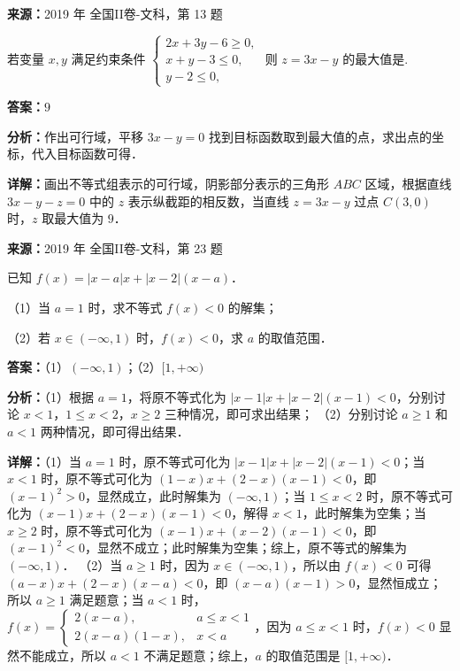 \begin{question}[points=5]
\textbf{来源：}2019 年 全国II卷-文科，第 13 题\par
若变量 $x,y$ 满足约束条件 $\begin{cases}2x+3y-6\ge 0,\\ x+y-3\le 0,\\ y-2\le 0,\end{cases}$ 则 $z=3x-y$ 的最大值是.
\fillin[{$9$}]
\begin{solution}
\textbf{答案：}$9$

\textbf{分析：}作出可行域，平移 $3x-y=0$ 找到目标函数取到最大值的点，求出点的坐标，代入目标函数可得．

\textbf{详解：}画出不等式组表示的可行域，阴影部分表示的三角形 $ABC$ 区域，根据直线 $3x-y-z=0$ 中的 $z$ 表示纵截距的相反数，当直线 $z=3x-y$ 过点 $C(3,0)$ 时，$z$ 取最大值为 $9$．
\end{solution}
\end{question}

\begin{question}[points=10]
\textbf{来源：}2019 年 全国II卷-文科，第 23 题\par
[选修 4-5：不等式选讲]

已知 $f(x)=|x-a|x+|x-2|(x-a)$．

（1）当 $a=1$ 时，求不等式 $f(x)<0$ 的解集；

（2）若 $x\in(-\infty,1)$ 时，$f(x)<0$，求 $a$ 的取值范围．
\begin{solution}
\textbf{答案：}（1）$(-\infty,1)$；（2）$[1,+\infty)$

\textbf{分析：}（1）根据 $a=1$，将原不等式化为 $|x-1|x+|x-2|(x-1)<0$，分别讨论 $x<1$，$1\le x<2$，$x\ge2$ 三种情况，即可求出结果；
（2）分别讨论 $a\ge1$ 和 $a<1$ 两种情况，即可得出结果．

\textbf{详解：}（1）当 $a=1$ 时，原不等式可化为 $|x-1|x+|x-2|(x-1)<0$；当 $x<1$ 时，原不等式可化为 $(1-x)x+(2-x)(x-1)<0$，即 $(x-1)^2>0$，显然成立，此时解集为 $(-\infty,1)$；当 $1\le x<2$ 时，原不等式可化为 $(x-1)x+(2-x)(x-1)<0$，解得 $x<1$，此时解集为空集；当 $x\ge2$ 时，原不等式可化为 $(x-1)x+(x-2)(x-1)<0$，即 $(x-1)^2<0$，显然不成立；此时解集为空集；综上，原不等式的解集为 $(-\infty,1)$．
（2）当 $a\ge1$ 时，因为 $x\in(-\infty,1)$，所以由 $f(x)<0$ 可得 $(a-x)x+(2-x)(x-a)<0$，即 $(x-a)(x-1)>0$，显然恒成立；所以 $a\ge1$ 满足题意；当 $a<1$ 时，$f(x)=\begin{cases}2(x-a), & a\le x<1 \\ 2(x-a)(1-x), & x<a\end{cases}$，因为 $a\le x<1$ 时，$f(x)<0$ 显然不能成立，所以 $a<1$ 不满足题意；综上，$a$ 的取值范围是 $[1,+\infty)$．
\end{solution}
\end{question}

